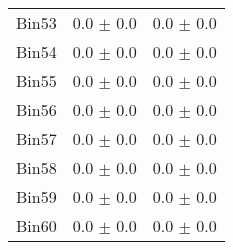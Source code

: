 \begin{tabular}{|c|c|c|}
     Bin53 & 0.0 $\pm$ 0.0 & 0.0 $\pm$ 0.0 \\ \cline{1-3} 
     Bin54 & 0.0 $\pm$ 0.0 & 0.0 $\pm$ 0.0 \\ \cline{1-3} 
     Bin55 & 0.0 $\pm$ 0.0 & 0.0 $\pm$ 0.0 \\ \cline{1-3} 
     Bin56 & 0.0 $\pm$ 0.0 & 0.0 $\pm$ 0.0 \\ \cline{1-3} 
     Bin57 & 0.0 $\pm$ 0.0 & 0.0 $\pm$ 0.0 \\ \cline{1-3} 
     Bin58 & 0.0 $\pm$ 0.0 & 0.0 $\pm$ 0.0 \\ \cline{1-3} 
     Bin59 & 0.0 $\pm$ 0.0 & 0.0 $\pm$ 0.0 \\ \cline{1-3} 
     Bin60 & 0.0 $\pm$ 0.0 & 0.0 $\pm$ 0.0 \\ \cline{1-3} 
  \end{tabular}
